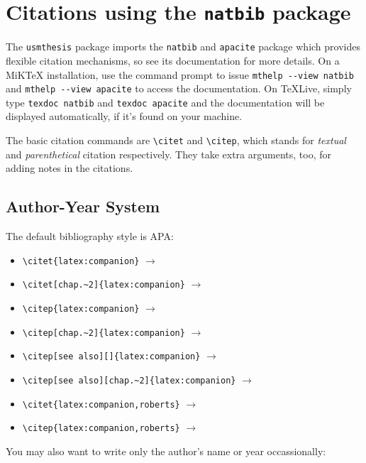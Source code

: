 \section{Citations using the \texttt{natbib} package}
The \verb|usmthesis| package imports the \verb|natbib| and \verb|apacite| package which provides flexible citation mechanisms, so see its documentation for more details.  On a MiK\TeX{} installation,
use the command prompt to issue \lstinline|mthelp --view natbib| and \lstinline|mthelp --view apacite| to access the documentation.
On TeXLive, simply type \verb|texdoc natbib| and \lstinline|texdoc apacite| and the documentation will be displayed automatically, if it's found on your machine.

The basic citation commands are \verb|\citet| and \verb|\citep|, which stands for \emph{textual} and \emph{parenthetical} citation respectively.  They take extra arguments, too, for adding notes in the citations.  

\subsection{Author-Year System}
The default bibliography style is APA:

\begin{itemize}[nosep]
\item \verb|\citet{latex:companion}| $\to$ \citet{latex:companion}
\item \verb|\citet[chap.~2]{latex:companion}| $\to$ \citet[chap.~2]{latex:companion}
\item \verb|\citep{latex:companion}| $\to$ \citep{latex:companion}
\item \verb|\citep[chap.~2]{latex:companion}| $\to$ \citep[chap.~2]{latex:companion}
\item \verb|\citep[see also][]{latex:companion}| $\to$ \citep[see also][]{latex:companion}
\item \verb|\citep[see also][chap.~2]{latex:companion}| $\to$ \citep[see also][chap.~2]{latex:companion}
\item \verb|\citet{latex:companion,roberts}| $\to$ \citet{latex:companion,roberts}
\item \verb|\citep{latex:companion,roberts}| $\to$ \citep{latex:companion,roberts}
\end{itemize}

You may also want to write only the author's name or year occassionally:

